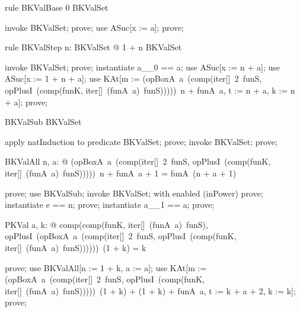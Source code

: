 \documentclass{article}
\begin{document}
\begin{theorem}{rule BKValBase}
  0 \in BKValSet
\end{theorem}

\begin{zproof}
invoke BKValSet;
prove;
use ASuc[x := a];
prove;
\end{zproof}

\begin{theorem}{rule BKValStep}
  \forall n: BKValSet @ 1 + n \in BKValSet
\end{theorem}

\begin{zproof}
invoke BKValSet;
prove;
instantiate a\_\_0 == a;
use ASuc[x := n + a];
use ASuc[x := 1 + n + a];
use KAt[m := (opBoxA~a~(comp(iter[\nat]~2~funS, opPlusI~(comp(funK, iter[\nat]~(funA~a)~funS)))))~n + funA~a, t := n + a, k := n + a];
prove;
\end{zproof}

\begin{theorem}{BKValSub}
  \nat \subseteq BKValSet
\end{theorem}

\begin{zproof}
apply natInduction to predicate \nat \subseteq BKValSet;
prove;
invoke BKValSet;
prove;
\end{zproof}

\begin{theorem}{BKValAll}
  \forall n, a: \nat @ (opBoxA~a~(comp(iter[\nat]~2~funS, opPlusI~(comp(funK, iter[\nat]~(funA~a)~funS)))))~n + funA~a + 1 = funA~(n + a + 1)
\end{theorem}

\begin{zproof}
prove;
use BKValSub;
invoke BKValSet;
with enabled (inPower) prove;
instantiate e == n;
prove;
instantiate a\_\_1 == a;
prove;
\end{zproof}

\begin{theorem}{PKVal}
  \forall a, k: \nat @ comp(comp(funK, iter[\nat]~(funA~a)~funS), opPlusI~(opBoxA~a~(comp(iter[\nat]~2~funS, opPlusI~(comp(funK, iter[\nat]~(funA~a)~funS))))))~(1 + k) = k
\end{theorem}

\begin{zproof}
prove;
use BKValAll[n := 1 + k, a := a];
use KAt[m := (opBoxA~a~(comp(iter[\nat]~2~funS, opPlusI~(comp(funK, iter[\nat]~(funA~a)~funS)))))~(1 + k) + (1 + k) + funA~a, t := k + a + 2, k := k];
prove;
\end{zproof}
\end{document}

